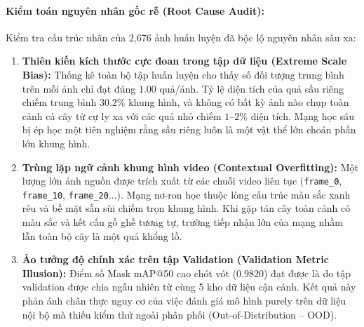 \documentclass[12pt,a4paper]{article}
\begin{document}
\paragraph{Kiểm toán nguyên nhân gốc rễ (Root Cause Audit):}
Kiểm tra cấu trúc nhãn của 2,676 ảnh huấn luyện đã bộc lộ nguyên nhân sâu xa:
\begin{enumerate}
    \item \textbf{Thiên kiến kích thước cực đoan trong tập dữ liệu (Extreme Scale Bias):} Thống kê toàn bộ tập huấn luyện cho thấy số đối tượng trung bình trên mỗi ảnh chỉ đạt đúng $1.00$ quả/ảnh. Tỷ lệ diện tích của quả sầu riêng chiếm trung bình $30.2\%$ khung hình, và không có bất kỳ ảnh nào chụp toàn cảnh cả cây từ cự ly xa với các quả nhỏ chiếm $1\text{--}2\%$ diện tích. Mạng học sâu bị ép học một tiên nghiệm rằng sầu riêng luôn là một vật thể lớn choán phần lớn khung hình.
    \item \textbf{Trùng lặp ngữ cảnh khung hình video (Contextual Overfitting):} Một lượng lớn ảnh nguồn được trích xuất từ các chuỗi video liên tục (\texttt{frame\_0}, \texttt{frame\_10}, \texttt{frame\_20}...). Mạng nơ-ron học thuộc lòng cấu trúc màu sắc xanh rêu và bề mặt sần sùi chiếm trọn khung hình. Khi gặp tán cây toàn cảnh có màu sắc và kết cấu gồ ghề tương tự, trường tiếp nhận lớn của mạng nhầm lẫn toàn bộ cây là một quả khổng lồ.
    \item \textbf{Ảo tưởng độ chính xác trên tập Validation (Validation Metric Illusion):} Điểm số Mask mAP@50 cao chót vót ($0.9820$) đạt được là do tập validation được chia ngẫu nhiên từ cùng 5 kho dữ liệu cận cảnh. Kết quả này phản ánh chân thực nguy cơ của việc đánh giá mô hình purely trên dữ liệu nội bộ mà thiếu kiểm thử ngoài phân phối (Out-of-Distribution -- OOD).
\end{enumerate}
\end{document}
